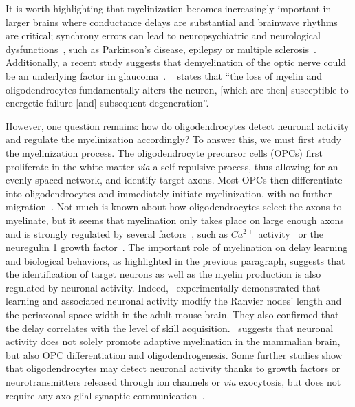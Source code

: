 \documentclass[brainsci, %
               review,submit,pdftex,moreauthors
               ]{Definitions/mdpi}
\begin{document}
It is worth highlighting that myelinization becomes increasingly important in larger brains where conductance delays are substantial and brainwave rhythms are critical; synchrony errors can lead to neuropsychiatric and neurological dysfunctions~\citep{fields_new_2015}, such as Parkinson's disease, epilepsy or multiple sclerosis~\citep{madadi_asl_dendritic_2018}. Additionally, a recent study suggests that demyelination of the optic nerve could be an underlying factor in glaucoma~\citep{xue_demyelination_2021}. ~\citet{duncan_neuron-oligodendrocyte_2021} states that ``the loss of myelin and oligodendrocytes fundamentally alters the neuron, [which are then] susceptible to energetic failure [and] subsequent degeneration''.  


However, one question remains: how do oligodendrocytes detect neuronal activity and regulate the myelinization accordingly? To answer this, we must first study the myelinization process. The oligodendrocyte precursor cells (OPCs) first proliferate in the white matter \textit{via} a self-repulsive process, thus allowing for an evenly spaced network, and identify target axons. Most OPCs then differentiate into oligodendrocytes and immediately initiate myelinization, with no further migration~\citep{simons_oligodendrocytes_2016}. Not much is known about how oligodendrocytes select the axons to myelinate, but it seems that myelination only takes place on large enough axons and is strongly regulated by several factors~\citep{kuhn_oligodendrocytes_2019}, such as $Ca^{2+}$ activity~\citep{baraban_ca2_2018} or the neuregulin 1 growth factor~\citep{nave_axonal_2006}. The important role of myelination on delay learning and biological behaviors, as highlighted in the previous paragraph, suggests that the identification of target neurons as well as the myelin production is also regulated by neuronal activity. Indeed,~\citet{cullen_periaxonal_2021} experimentally demonstrated that learning and associated neuronal activity modify the Ranvier nodes' length and the periaxonal space width in the adult mouse brain. They also confirmed that the delay correlates with the level of skill acquisition.~\citet{gibson_neuronal_2014} suggests that neuronal activity does not solely promote adaptive myelination in the mammalian brain, but also OPC differentiation and oligodendrogenesis. Some further studies show that oligodendrocytes may detect neuronal activity thanks to growth factors or neurotransmitters released through ion channels or \textit{via} exocytosis, but does not require any axo-glial synaptic communication~\citep{fields_new_2015}. 
\end{document}
